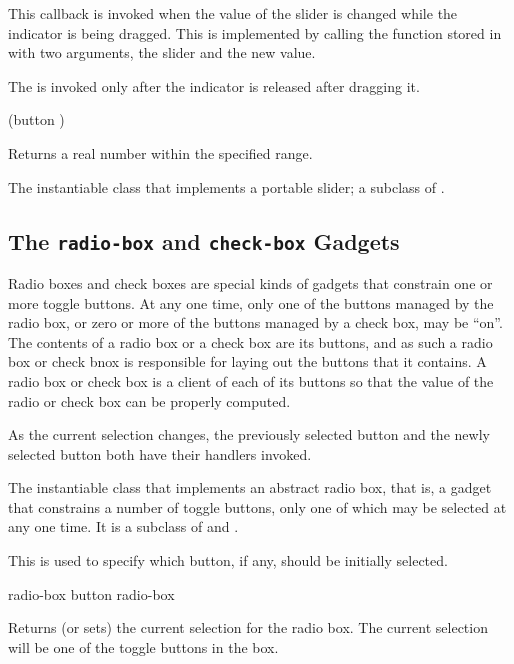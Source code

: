 This callback is invoked when the value of the slider is changed while the
indicator is being dragged.  This is implemented by calling the function stored
in  with two arguments, the slider and the new value.

The  is invoked only after the indicator is released
after dragging it.

 {(button )}

Returns a real number within the specified range.


The instantiable class that implements a portable slider; a subclass of
.


\subsection {The {\tt radio-box} and {\tt check-box} Gadgets}

Radio boxes and check boxes are special kinds of gadgets that constrain one or
more toggle buttons.  At any one time, only one of the buttons managed by the
radio box, or zero or more of the buttons managed by a check box, may be ``on''.
The contents of a radio box or a check box are its buttons, and as such a radio
box or check bnox is responsible for laying out the buttons that it contains.  A
radio box or check box is a client of each of its buttons so that the value of
the radio or check box can be properly computed.

As the current selection changes, the previously selected button and the newly
selected button both have their  handlers invoked.


The instantiable class that implements an abstract radio box, that is, a gadget
that constrains a number of toggle buttons, only one of which may be selected at
any one time.  It is a subclass of  and
.


This is used to specify which button, if any, should be initially selected.

 {radio-box}
 {button radio-box}

Returns (or sets) the current selection for the radio box.  The current
selection will be one of the toggle buttons in the box.

